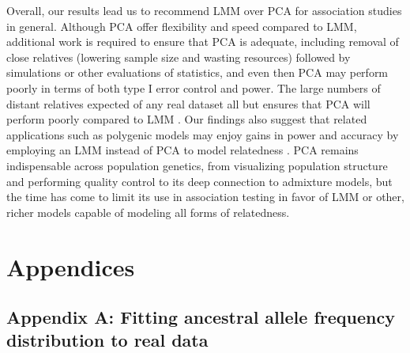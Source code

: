 \documentclass[11pt]{article}
\begin{document}
\begin{linenumbers}
Overall, our results lead us to recommend LMM over PCA for association studies in general.
Although PCA offer flexibility and speed compared to LMM, additional work is required to ensure that PCA is adequate, including removal of close relatives (lowering sample size and wasting resources) followed by simulations or other evaluations of statistics, and even then PCA may perform poorly in terms of both type I error control and power.
The large numbers of distant relatives expected of any real dataset all but ensures that PCA will perform poorly compared to LMM \citep{henn_cryptic_2012, shchur_number_2018, loh_mixed-model_2018}.
Our findings also suggest that related applications such as polygenic models may enjoy gains in power and accuracy by employing an LMM instead of PCA to model relatedness \citep{rakitsch_lasso_2013,qian_fast_2020}.
PCA remains indispensable across population genetics, from visualizing population structure and performing quality control to its deep connection to admixture models, but the time has come to limit its use in association testing in favor of LMM or other, richer models capable of modeling all forms of relatedness.


\section{Appendices}

\subsection{Appendix A: Fitting ancestral allele frequency distribution to real data}


\end{linenumbers}
\end{document}
